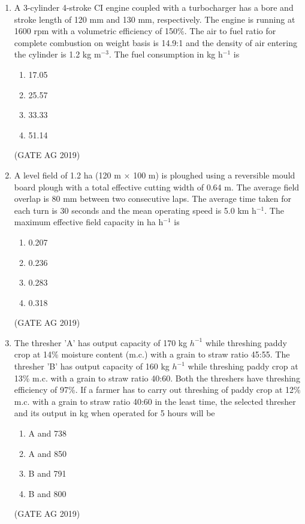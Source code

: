 \documentclass[journal,12pt,onecolumn]{IEEEtran}
\theoremstyle{remark}
\begin{document}
\begin{enumerate}
\item A 3-cylinder 4-stroke CI engine coupled with a turbocharger has a bore and stroke length of 120 mm and 130 mm, respectively. The engine is running at 1600 rpm with a volumetric efficiency of 150\%. The air to fuel ratio for complete combustion on weight basis is 14.9:1 and the density of air entering the cylinder is 1.2 kg m$^{-3}$. The fuel consumption in kg h$^{-1}$ is  
\begin{multicols}{4}
\begin{enumerate}
\item 17.05
\item 25.57
\item 33.33
\item 51.14
\end{enumerate}
\end{multicols}
\hfill{(GATE AG 2019)}
\item 
A level field of 1.2 ha (120 m $\times$ 100 m) is ploughed using a reversible mould board plough with a total effective cutting width of 0.64 m. The average field overlap is 80 mm between two consecutive laps. The average time taken for each turn is 30 seconds and the mean operating speed is 5.0 km h$^{-1}$. The maximum effective field capacity in ha h$^{-1}$ is  
\begin{multicols}{4}
\begin{enumerate}
\item 0.207
\item 0.236
\item 0.283
\item 0.318
\end{enumerate}
\end{multicols}
\hfill{(GATE AG 2019)}


\item 
The thresher 'A' has output capacity of 170 kg $h^{-1}$ while threshing paddy crop at 14\% moisture content (m.c.) with a grain to straw ratio 45:55. 
The thresher 'B' has output capacity of 160 kg $h^{-1}$ while threshing paddy crop at 13\% m.c. with a grain to straw ratio 40:60. 
Both the threshers have threshing efficiency of 97\%. 
If a farmer has to carry out threshing of paddy crop at 12\% m.c. with a grain to straw ratio 40:60 in the least time, 
the selected thresher and its output in kg when operated for 5 hours will be

\begin{multicols}{4}
\begin{enumerate}
\item A and 738
\item A and 850
\item B and 791
\item B and 800
\end{enumerate}
\end{multicols}
\hfill{(GATE AG 2019)}


\end{enumerate}
\end{document}
